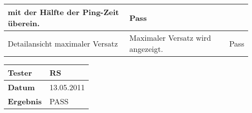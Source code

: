 \begin{table}[h]
\begin{center}
\begin{tabular}{|p{2.5cm}|p{5cm}|p{7.55cm}|}
                    mit der Hälfte der Ping-Zeit überein. & Pass\\
                \hline
                    Detailansicht maximaler Versatz & Maximaler Versatz wird
                    angezeigt. & Pass\\
                \hline
            \end{tabular}
            \begin{tabular}{|p{3.5cm}|p{11cm}|}
                \textbf{Tester} & RS\\
                \hline
                \textbf{Datum} & 13.05.2011\\
                \hline
                \textbf{Ergebnis} & PASS\\
                \hline
            \end{tabular}
        \end{center}
    \end{table}